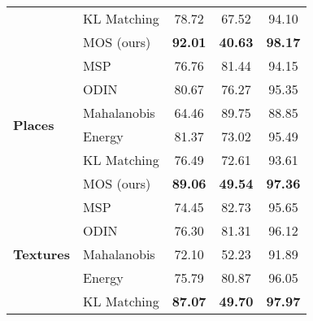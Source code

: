 \documentclass[final]{cvpr}
\begin{document}
\begin{table*}[h]
\begin{tabular}{l|l|ccc}
                                      & KL Matching                                           & 78.72                & 67.52                & 94.10                \\
                                      & MOS (ours)                                            & \textbf{92.01}       & \textbf{40.63}       & \textbf{98.17}       \\ \midrule
\multirow{6}{*}{\textbf{Places}}      & MSP                                                   & 76.76                & 81.44                & 94.15                \\
                                      & ODIN                                                  & 80.67                & 76.27                & 95.35                \\
                                      & Mahalanobis                                           & 64.46                & 89.75                & 88.85                \\
                                      & Energy                                                & 81.37                & 73.02                & 95.49                \\
                                      & KL Matching                                           & 76.49                & 72.61                & 93.61                \\
                                      & MOS (ours)                                            & \textbf{89.06}       & \textbf{49.54}       & \textbf{97.36}       \\ \midrule
\multirow{6}{*}{\textbf{Textures}}    & MSP                                                   & 74.45                & 82.73                & 95.65                \\
                                      & ODIN                                                  & 76.30                & 81.31                & 96.12                \\
                                      & Mahalanobis                                           & 72.10                & 52.23                & 91.89                \\
                                      & Energy                                                & 75.79                & 80.87                & 96.05                \\
                                      & KL Matching                                           & \textbf{87.07}       & \textbf{49.70}       & \textbf{97.97}       \\

\end{tabular}
\end{table*}
\end{document}
